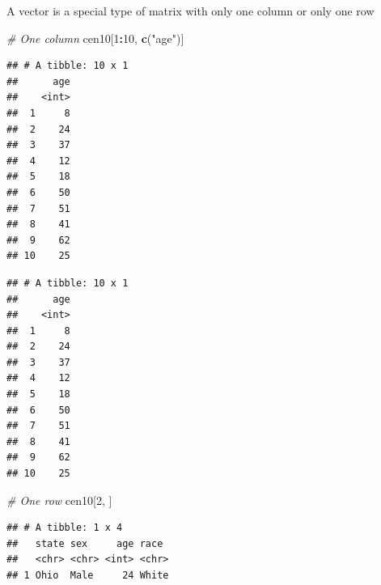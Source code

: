 \documentclass[]{book}
\newenvironment{Shaded}{\begin{snugshade}}{\end{snugshade}}
\newcommand{\CommentTok}[1]{\textcolor[rgb]{0.56,0.35,0.01}{\textit{#1}}}
\newcommand{\DecValTok}[1]{\textcolor[rgb]{0.00,0.00,0.81}{#1}}
\newcommand{\KeywordTok}[1]{\textcolor[rgb]{0.13,0.29,0.53}{\textbf{#1}}}
\newcommand{\NormalTok}[1]{#1}
\newcommand{\OperatorTok}[1]{\textcolor[rgb]{0.81,0.36,0.00}{\textbf{#1}}}
\newcommand{\StringTok}[1]{\textcolor[rgb]{0.31,0.60,0.02}{#1}}
\theoremstyle{definition}
\theoremstyle{definition}
\theoremstyle{definition}
\theoremstyle{remark}
\begin{document}
A vector is a special type of matrix with only one column or only one row

\begin{Shaded}
\begin{Highlighting}[]
\CommentTok{# One column}
\NormalTok{cen10[}\DecValTok{1}\OperatorTok{:}\DecValTok{10}\NormalTok{, }\KeywordTok{c}\NormalTok{(}\StringTok{"age"}\NormalTok{)]}
\end{Highlighting}
\end{Shaded}

\begin{verbatim}
## # A tibble: 10 x 1
##      age
##    <int>
##  1     8
##  2    24
##  3    37
##  4    12
##  5    18
##  6    50
##  7    51
##  8    41
##  9    62
## 10    25
\end{verbatim}

\begin{Shaded}
\end{Shaded}

\begin{verbatim}
## # A tibble: 10 x 1
##      age
##    <int>
##  1     8
##  2    24
##  3    37
##  4    12
##  5    18
##  6    50
##  7    51
##  8    41
##  9    62
## 10    25
\end{verbatim}

\begin{Shaded}
\begin{Highlighting}[]
\CommentTok{# One row}
\NormalTok{cen10[}\DecValTok{2}\NormalTok{, ]}
\end{Highlighting}
\end{Shaded}

\begin{verbatim}
## # A tibble: 1 x 4
##   state sex     age race 
##   <chr> <chr> <int> <chr>
## 1 Ohio  Male     24 White
\end{verbatim}

\begin{Shaded}
\end{Shaded}
\end{document}
